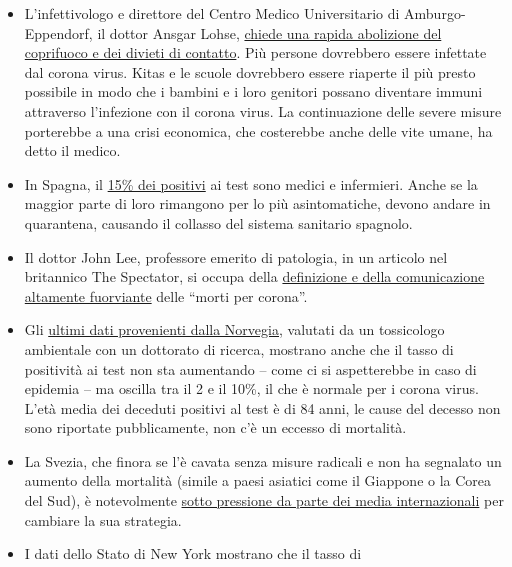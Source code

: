 \begin{itemize}
\tightlist
\item
  L'infettivologo e direttore del Centro Medico Universitario di
  Amburgo-Eppendorf, il dottor Ansgar Lohse,
  \href{https://www.mopo.de/hamburg/uke-infektiologe-fordert-es-muessen-sich-mehr-menschen-mit-corona-infizieren-36483636}{chiede
  una rapida abolizione del coprifuoco e dei divieti di contatto}. Più
  persone dovrebbero essere infettate dal corona virus. Kitas e le
  scuole dovrebbero essere riaperte il più presto possibile in modo che
  i bambini e i loro genitori possano diventare immuni attraverso
  l'infezione con il corona virus. La continuazione delle severe misure
  porterebbe a una crisi economica, che costerebbe anche delle vite
  umane, ha detto il medico.
\item
  In Spagna, il
  \href{https://www.heise.de/tp/features/Das-ist-keine-Krise-sondern-eine-Katastrophe-4694104.html}{15\%
  dei positivi} ai test sono medici e infermieri. Anche se la maggior
  parte di loro rimangono per lo più asintomatiche, devono andare in
  quarantena, causando il collasso del sistema sanitario spagnolo.
\item
  Il dottor John Lee, professore emerito di patologia, in un articolo
  nel britannico The Spectator, si occupa della
  \href{https://www.spectator.co.uk/article/how-to-understand-and-report-figures-for-covid-19-deaths-}{definizione
  e della comunicazione altamente fuorviante} delle ``morti per
  corona''.
\item
  Gli
  \href{https://swprs.files.wordpress.com/2020/04/die-lage-in-norwegen.pdf}{ultimi
  dati provenienti dalla Norvegia,} valutati da un tossicologo
  ambientale con un dottorato di ricerca, mostrano anche che il tasso di
  positività ai test non sta aumentando -- come ci si aspetterebbe in
  caso di epidemia -- ma oscilla tra il 2 e il 10\%, il che è normale
  per i corona virus. L'età media dei deceduti positivi al test è di 84
  anni, le cause del decesso non sono riportate pubblicamente, non c'è
  un eccesso di mortalità.
\item
  La Svezia, che finora se l'è cavata senza misure radicali e non ha
  segnalato un aumento della mortalità (simile a paesi asiatici come il
  Giappone o la Corea del Sud), è notevolmente
  \href{https://www.theguardian.com/world/2020/mar/30/catastrophe-sweden-coronavirus-stoicism-lockdown-europe}{sotto
  pressione da parte dei media internazionali} per cambiare la sua
  strategia.
\item
  I dati dello Stato di New York mostrano che il tasso di

\end{itemize}
